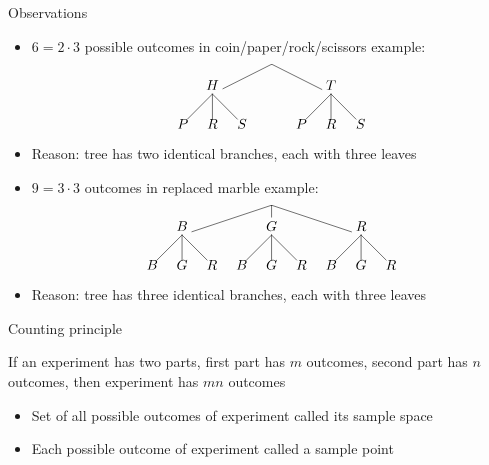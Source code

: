 \documentclass{beamer}
\theoremstyle{definition}
\begin{document}
\begin{frame}{Observations}
\begin{itemize}
\item $6=2\cdot 3$ possible outcomes in coin/paper/rock/scissors example:
\[\begin{xy}<.75cm,0cm>:
(0,0)="0";
(-2,-1)="-21";
(2,-1)="21";
"0";"-21"*+!D{H}**\dir{-};
"0";"21"*+!D{T}**\dir{-};
"-21";(-3,-2)*{P}**\dir{-};
"-21";(-2,-2)*{R}**\dir{-};
"-21";(-1,-2)*{S}**\dir{-};
"21";(1,-2)*{P}**\dir{-};
"21";(2,-2)*{R}**\dir{-};
"21";(3,-2)*{S}**\dir{-};
\end{xy}\]
\item Reason: tree has two \alert{identical} branches, each with three leaves
\item $9=3\cdot 3$ outcomes in replaced marble example:
\[\begin{xy}<.75cm,0cm>:
(0,0)="0";
(-3,-1)="-31";
(0,-1)="01";
(3,-1)="31";
"0";"-31"*+!D{B}**\dir{-};
"0";"01"*+!D{G}**\dir{-};
"0";"31"*+!D{R}**\dir{-};
"-31";(-4,-2)*{B}**\dir{-};
"-31";(-3,-2)*{G}**\dir{-};
"-31";(-2,-2)*{R}**\dir{-};
"01";(-1,-2)*{B}**\dir{-};
"01";(0,-2)*{G}**\dir{-};
"01";(1,-2)*{R}**\dir{-};
"31";(2,-2)*{B}**\dir{-};
"31";(3,-2)*{G}**\dir{-};
"31";(4,-2)*{R}**\dir{-};
\end{xy}\]
\item Reason: tree has three \alert{identical} branches,
each with three leaves
\end{itemize}
\end{frame}

\begin{frame}{Counting principle}
\begin{lemma}
If an experiment has two parts, first
part has $m$ outcomes, second part
has $n$ outcomes, then experiment
has $mn$ outcomes
\end{lemma}
\begin{definition}
\begin{itemize}
\item Set of all possible outcomes of experiment called
its \alert{sample space}
\item Each possible outcome of experiment called
a \alert{sample point}
\end{itemize}
\end{definition}
\end{frame}
\end{document}
